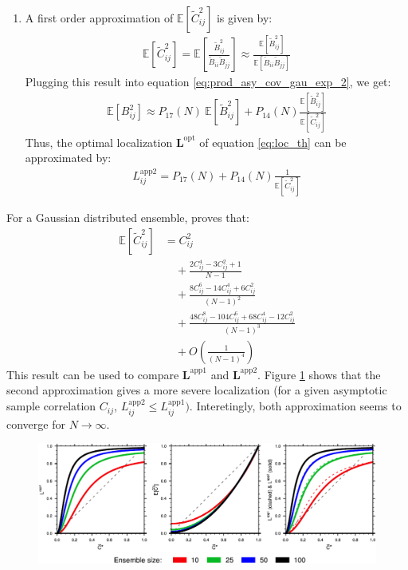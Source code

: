 \documentclass[12pt]{scrartcl}
\begin{document}
\begin{enumerate}
\item A first order approximation of $\mathbb{E} \left[\widetilde{C}_{ij}^2 \right]$ is given by:
\begin{align}
\label{eq:corsq_first_order}
\mathbb{E} \left[\widetilde{C}_{ij}^2 \right] = \mathbb{E} \left[\frac{\widetilde{B}^2_{ij}}{\widetilde{B}_{ii} \widetilde{B}_{jj}} \right] \approx \frac{\mathbb{E} \left[\widetilde{B}_{ij}^2 \right]}{\mathbb{E} \left[\widetilde{B}_{ii} \widetilde{B}_{jj}\right]}
\end{align}
Plugging this result into equation \eqref{eq:prod_asy_cov_gau_exp_2}, we get:
\begin{align}
\mathbb{E} \left[B^2_{ij}\right] \approx P_{17}(N) \ \mathbb{E} \left[\widetilde{B}_{ij}^2\right] + P_{14}(N) \frac{\mathbb{E} \left[\widetilde{B}_{ij}^2\right]}{\mathbb{E} \left[\widetilde{C}_{ij}^2 \right]}
\end{align}
Thus, the optimal localization $\mathbf{L}^\mathrm{opt}$ of equation \eqref{eq:loc_th} can be approximated by:
\begin{align}
\label{eq:local_gau_cor_2}
L^\mathrm{app2}_{ij} = P_{17}(N) + P_{14}(N) \frac{1}{\mathbb{E} \left[\widetilde{C}_{ij}^2\right]}
\end{align}
\end{enumerate}
For a Gaussian distributed ensemble, \citet{rady_2005} proves that:
\begin{align}
\mathbb{E} \left[\widetilde{C}_{ij}^2\right] & = C^2_{ij} \nonumber \\
& \quad + \frac{2 C^4_{ij} - 3 C^2_{ij} + 1}{N-1} \nonumber \\
& \quad + \frac{8 C^6_{ij} - 14 C^4_{ij} + 6 C^2_{ij}}{(N-1)^2} \nonumber \\
& \quad + \frac{48 C^8_{ij} - 104 C^6_{ij} + 68 C^4_{ij} - 12 C^2_{ij}}{(N-1)^3} \nonumber \\
& \quad + O\left(\frac{1}{(N-1)^4}\right)
\end{align}
This result can be used to compare $\mathbf{L}^\mathrm{app1}$ and $\mathbf{L}^\mathrm{app2}$. Figure \ref{fig:corloc} shows that the second approximation gives a more severe localization (for a given asymptotic sample correlation $C_{ij}$, $L^\mathrm{app2}_{ij} \le L^\mathrm{app1}_{ij})$. Interetingly, both approximation seems to converge for $N \rightarrow \infty$.

\begin{center}
\begin{figure}[h!]
  \noindent\includegraphics[width=\textwidth]{corloc.pdf}\\
  \caption{} \label{fig:corloc}
\end{figure}
\end{center}
\end{document}
